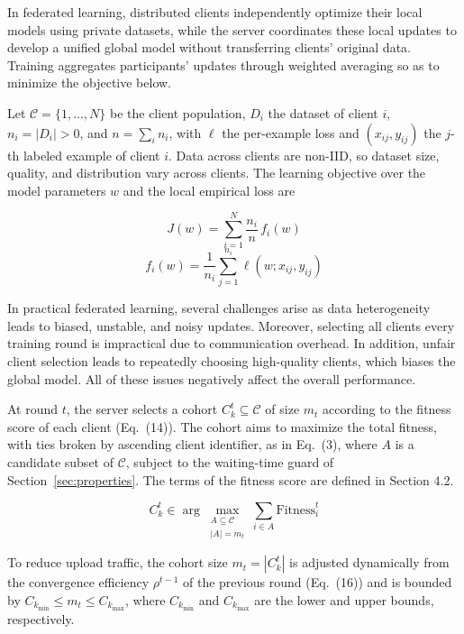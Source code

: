 \documentclass[pdflatex,sn-mathphys-num,oneside]{sn-jnl}%
\theoremstyle{thmstyleone}%
\theoremstyle{thmstyletwo}%
\theoremstyle{thmstylethree}%
\begin{document}
In federated learning, distributed clients independently optimize their local models using private datasets, while the server coordinates these local updates to develop a unified global model without transferring clients' original data. Training aggregates participants' updates through weighted averaging so as to minimize the objective below.

Let $\mathcal{C}=\{1,\dots,N\}$ be the client population, $D_i$ the dataset of client $i$, $n_i=|D_i|>0$, and $n=\sum_i n_i$, with $\ell$ the per-example loss and $(x_{ij},y_{ij})$ the $j$-th labeled example of client $i$. Data across clients are non-IID, so dataset size, quality, and distribution vary across clients. The learning objective over the model parameters $w$ and the local empirical loss are

\begin{equation}
J(w) = \sum_{i=1}^{N} \frac{n_i}{n}\, f_i(w)
\label{eq:global_obj}
\end{equation}
\begin{equation}
f_i(w) = \frac{1}{n_i}\sum_{j=1}^{n_i} \ell(w; x_{ij}, y_{ij})
\label{eq:local_obj}
\end{equation}

In practical federated learning, several challenges arise as data heterogeneity leads to biased, unstable, and noisy updates. Moreover, selecting all clients every training round is impractical due to communication overhead. In addition, unfair client selection leads to repeatedly choosing high-quality clients, which biases the global model. All of these issues negatively affect the overall performance.

At round $t$, the server selects a cohort $C_k^t \subseteq \mathcal{C}$ of size $m_t$ according to the fitness score of each client (Eq.~(14)). The cohort aims to maximize the total fitness, with ties broken by ascending client identifier, as in Eq.~(3), where $A$ is a candidate subset of $\mathcal{C}$, subject to the waiting-time guard of Section~\ref{sec:properties}. The terms of the fitness score are defined in Section 4.2.

\begin{equation}
C_k^t \in \arg\max_{\substack{A \subseteq \mathcal{C} \\ |A| = m_t}} \sum_{i \in A} \mathrm{Fitness}_i^t
\label{eq:client_selection}
\end{equation}

To reduce upload traffic, the cohort size $m_t=|C_k^t|$ is adjusted dynamically from the convergence efficiency $\rho^{t-1}$ of the previous round (Eq.~(16)) and is bounded by $C_{k_{\min}} \le m_t \le C_{k_{\max}}$, where $C_{k_{\min}}$ and $C_{k_{\max}}$ are the lower and upper bounds, respectively.
\end{document}

